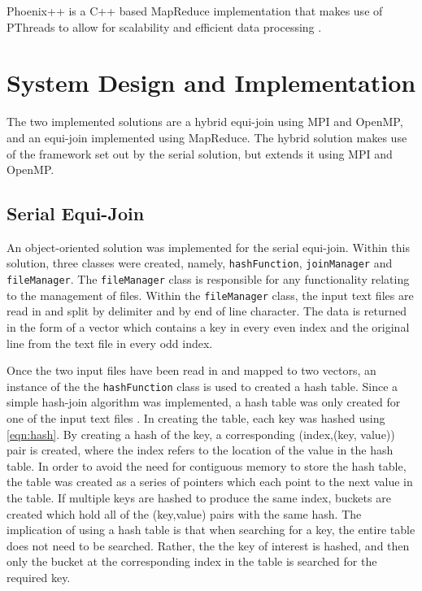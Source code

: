\documentclass[10pt,twocolumn]{witseiepaper}
\begin{document}
Phoenix++ is a C++ based MapReduce implementation that makes use of PThreads to allow for scalability and efficient data processing \cite{phoenix}.

\section{System Design and Implementation}
The two implemented solutions are a hybrid equi-join using MPI and OpenMP, and an equi-join implemented using MapReduce. The hybrid solution makes use of the framework set out by the serial solution, but extends it using MPI and OpenMP.

\subsection{Serial Equi-Join}
An object-oriented solution was implemented for the serial equi-join. Within this solution, three classes were created, namely, \texttt{hashFunction}, \texttt{joinManager} and \texttt{fileManager}. The \texttt{fileManager} class is responsible for any functionality relating to the management of files. Within the \texttt{fileManager} class, the input text files are read in and split by delimiter and by end of line character. The data is returned in the form of a vector which contains a key in every even index and the original line from the text file in every odd index.

Once the two input files have been read in and mapped to two vectors, an instance of the the \texttt{hashFunction} class is used to created a hash table. Since a simple hash-join algorithm was implemented, a hash table was only created for one of the input text files \cite{evaluating4JoinAlgorithms}. In creating the table, each key was hashed using \ref{eqn:hash}. By creating a hash of the key, a corresponding (index,(key, value)) pair is created, where the index refers to the location of the value in the hash table. In order to avoid the need for contiguous memory to store the hash table, the table was created as a series of pointers which each point to the next value in the table. If multiple keys are hashed to produce the same index, buckets are created which hold all of the (key,value) pairs with the same hash. The implication of using a hash table is that when searching for a key, the entire table does not need to be searched. Rather, the the key of interest is hashed, and then only the bucket at the corresponding index in the table is searched for the required key.
\end{document}
